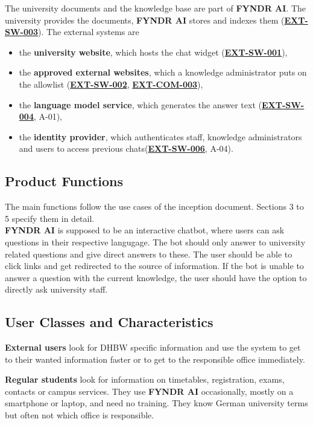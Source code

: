 \documentclass[11pt, a4paper]{article}
\newcommand{\reqref}[1]{\hyperref[req:#1]{\textbf{#1}}}
\begin{document}
The university documents and the knowledge base are part of \textbf{FYNDR AI}. The university provides the documents, \textbf{FYNDR AI} stores and indexes them (\reqref{EXT-SW-003}). The external systems are
\begin{itemize}
    \item the \textbf{university website}, which hosts the chat widget (\reqref{EXT-SW-001}),
    \item the \textbf{approved external websites}, which a knowledge administrator puts on the allowlist (\reqref{EXT-SW-002}, \reqref{EXT-COM-003}),
    \item the \textbf{language model service}, which generates the answer text (\reqref{EXT-SW-004}, A-01),
    \item the \textbf{identity provider}, which authenticates staff, knowledge administrators and users to access previous chats(\reqref{EXT-SW-006}, A-04).
\end{itemize}

\subsection{Product Functions}
The main functions follow the use cases of the inception document. Sections 3 to 5 specify them in detail.\\
\textbf{FYNDR AI} is supposed to be an interactive chatbot, where users can ask questions in their respective langugage. The bot should only answer to university related questions and give direct answers to these. The user should be able to click links and get redirected to the source of information. If the bot is unable to answer a question with the current knowledge, the user should have the option to directly ask university staff.

\subsection{User Classes and Characteristics}

\textbf{External users} look for DHBW specific information and use the system to get to their wanted information faster or to get to the responsible office immediately.

\textbf{Regular students} look for information on timetables, registration, exams, contacts or campus services. They use \textbf{FYNDR AI} occasionally, mostly on a smartphone or laptop, and need no training. They know German university terms but often not which office is responsible.
\end{document}
